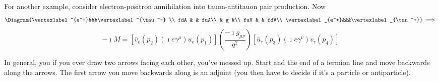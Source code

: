 \documentclass[a4paper,twoside,master.tex]{subfiles}
\begin{document}
For another example, consider electron-positron annihilation into tauon-antitauon pair production. Now
\begin{equation}
    \Diagram{\vertexlabel^{e^-}&&&\vertexlabel^{\tau^-} \\
fdA & & fuA\\
   & g &\\
fuV & & fdV\\
   \vertexlabel_{e^+}&&&\vertexlabel_{\tau^+}}\implies
\end{equation}
\begin{equation}
    - \imath M = [\bar{v}_e(p_2) (\imath e \gamma^{\mu}) u_e(p_1)] \left( \frac{- \imath g_{\mu \nu}}{q^2} \right) [\bar{u}_{\tau}(p_3) (\imath e \gamma^{\nu}) v_{\tau}(p_4)]
\end{equation}

In general, you if you ever draw two arrows facing each other, you've messed up. Start and the end of a fermion line and move backwards along the arrows. The first arrow you move backwards along is an adjoint (you then have to decide if it's a particle or antiparticle).
\end{document}
